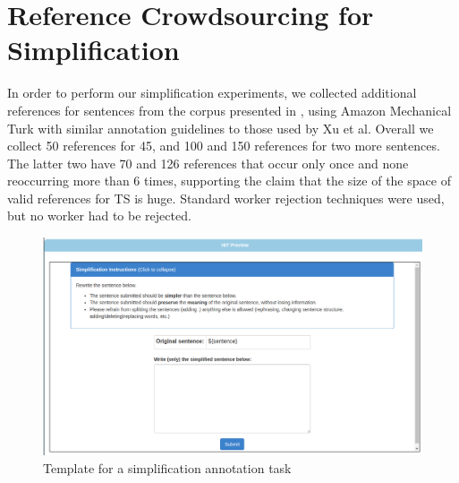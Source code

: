 \documentclass[letterpaper, 11pt]{article}
\begin{document}
\section{Reference Crowdsourcing for Simplification}\label{ap:simp-rerank}
In order to perform our simplification experiments, 
we collected additional references for sentences from the corpus presented in , using Amazon
Mechanical Turk with similar annotation guidelines to those used by Xu et al. 
Overall we collect 50 references for 45, and 100 and 150 references for two more sentences.
The latter two have 70 and 126 references that occur only once and none reoccurring more than 6 times, 
supporting the claim that the size of the space of valid references for TS is huge.
Standard worker rejection techniques were used, but no worker had to be rejected.

\begin{figure}[h!]
	\includegraphics[width=0.9\columnwidth]{simplification_task}
	\caption{Template for a simplification annotation task} 
\end{figure}
\FloatBarrier
\end{document}
